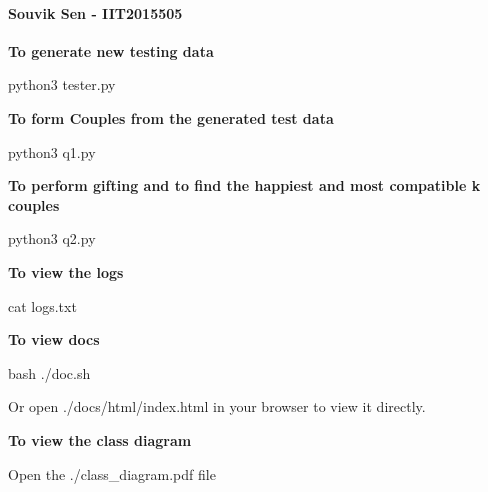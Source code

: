 \paragraph*{Souvik Sen -\/ I\+I\+T2015505}

{\bfseries To generate new testing data}


\begin{DoxyCode}
python3 tester.py
\end{DoxyCode}


{\bfseries To form Couples from the generated test data}


\begin{DoxyCode}
python3 q1.py
\end{DoxyCode}


{\bfseries To perform gifting and to find the happiest and most compatible k couples}


\begin{DoxyCode}
python3 q2.py
\end{DoxyCode}


{\bfseries To view the logs}


\begin{DoxyCode}
cat logs.txt
\end{DoxyCode}


{\bfseries To view docs}


\begin{DoxyCode}
bash ./doc.sh
\end{DoxyCode}
 Or open ./docs/html/index.html in your browser to view it directly.

{\bfseries To view the class diagram}

Open the ./class\+\_\+diagram.pdf file 